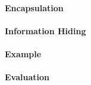 \paragraph{Encapsulation}\label{par:Ruby_Encapsulation}
\paragraph{Information Hiding}\label{par:Ruby_Info_Hiding}
\paragraph{Example}\label{par:Ruby_Abstract_Data_Type_Example}
\paragraph{Evaluation}\label{par:Ruby_Abstract_Data_Type_Evaluation}

